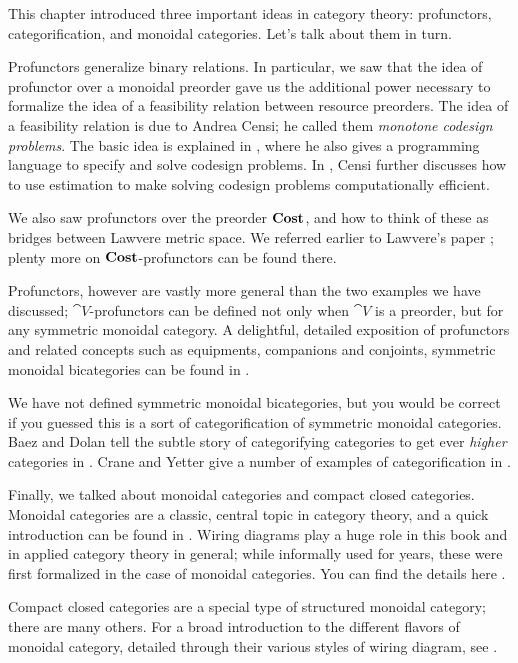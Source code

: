 \documentclass[7Sketches]{subfiles}
\begin{document}
This chapter introduced three important ideas in category theory: profunctors,
categorification, and monoidal categories. Let's talk about them in turn.

Profunctors generalize binary relations. In particular, we saw that the idea of
profunctor over a monoidal preorder gave us the additional power necessary to
formalize the idea of a feasibility relation between resource preorders. The idea
of a feasibility relation is due to Andrea Censi; he called them \emph{monotone
codesign problems}. The basic idea is explained in \cite{Censi:2015a}, where he
also gives a programming language to specify and solve codesign problems. In
\cite{censi:2017a}, Censi further discusses how to use estimation to make
solving codesign problems computationally efficient.

We also saw profunctors over the preorder $\mathbf{Cost}$, and how to think of these as
bridges between Lawvere metric space. We referred earlier to Lawvere's paper
\cite{Lawvere:1973a}; plenty more on $\mathbf{Cost}$-profunctors can be found there.

Profunctors, however are vastly more general than the two examples we have
discussed; $\cat{V}$-profunctors can be defined not only when $\cat{V}$ is a
preorder, but for any symmetric monoidal category. A delightful, detailed
exposition of profunctors and related concepts such as equipments, companions
and conjoints, symmetric monoidal bicategories can be found in
\cite{Shulman:2008a,Shulman:2010a}.

We have not defined symmetric monoidal bicategories, but you would be correct if
you guessed this is a sort of categorification of symmetric monoidal
categories. Baez and Dolan tell the subtle story of categorifying categories to
get ever \emph{higher} categories in \cite{Baez.Dolan:1998}. Crane and Yetter
give a number of examples of categorification in \cite{Crane.Yetter:1996a}.

Finally, we talked about monoidal categories and compact closed categories.
Monoidal categories are a classic, central topic in category theory, and a quick
introduction can be found in \cite{MacLane:1998a}. Wiring diagrams play a huge
role in this book and in applied category theory in general; while informally
used for years, these were first formalized in the case of monoidal categories.
You can find the details here
\cite{Joyal.Street:1993a,Joyal.Street.Verity:1996a}.

Compact closed categories are a special type of structured monoidal category;
there are many others. For a broad introduction to the different flavors of
monoidal category, detailed through their various styles of wiring diagram, see
\cite{selinger2010survey}.%

%

\end{document}
